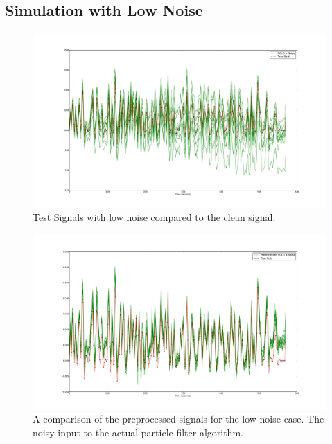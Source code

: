 \subsection{Simulation with Low Noise}
\label{sec:SimLowNoise}
\begin{figure}
\centering
\includegraphics[clip=true,trim=6cm 2cm 5cm 3.5cm,width=15cm]{images/realization_lownoise}
\caption{Test Signals with low noise compared to the clean signal.}
\label{fig:LowNoiseRealization}
\end{figure}

\begin{figure}
\centering
\includegraphics[clip=true,trim=6cm 2cm 5cm 3.5cm,width=15cm]{images/preprocessed_lownoise}
\caption{A comparison of the preprocessed signals for the low noise case. The
noisy input to the actual particle filter algorithm.}
\label{fig:PreprocessedLowNoise}
\end{figure}

